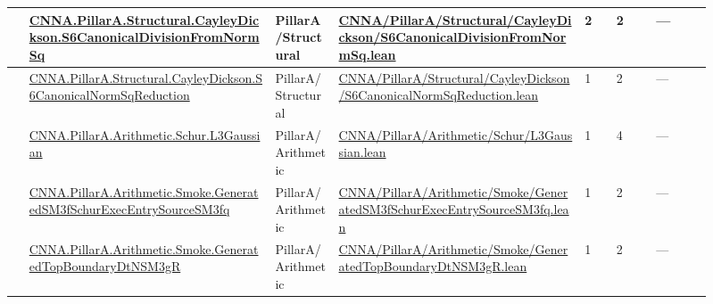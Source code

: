 \begin{longtable}{L{0.025\linewidth} L{0.315\linewidth} L{0.08\linewidth} L{0.315\linewidth} L{0.045\linewidth} L{0.055\linewidth} L{0.07\linewidth}}
\hline
{} & \href{run:repo_snapshot/CNNA/PillarA/Structural/CayleyDickson/S6CanonicalDivisionFromNormSq.lean}{CNNA.\allowbreak{}PillarA.\allowbreak{}Structural.\allowbreak{}CayleyDickson.\allowbreak{}S6CanonicalDivisionFromNormSq} & PillarA/\allowbreak{}Structural & \href{run:repo_snapshot/CNNA/PillarA/Structural/CayleyDickson/S6CanonicalDivisionFromNormSq.lean}{CNNA/\allowbreak{}PillarA/\allowbreak{}Structural/\allowbreak{}CayleyDickson/\allowbreak{}S6CanonicalDivisionFromNormSq.\allowbreak{}lean} & 2 & 2 & ---\\
\hline
{} & \href{run:repo_snapshot/CNNA/PillarA/Structural/CayleyDickson/S6CanonicalNormSqReduction.lean}{CNNA.\allowbreak{}PillarA.\allowbreak{}Structural.\allowbreak{}CayleyDickson.\allowbreak{}S6CanonicalNormSqReduction} & PillarA/\allowbreak{}Structural & \href{run:repo_snapshot/CNNA/PillarA/Structural/CayleyDickson/S6CanonicalNormSqReduction.lean}{CNNA/\allowbreak{}PillarA/\allowbreak{}Structural/\allowbreak{}CayleyDickson/\allowbreak{}S6CanonicalNormSqReduction.\allowbreak{}lean} & 1 & 2 & ---\\
\hline
{} & \href{run:repo_snapshot/CNNA/PillarA/Arithmetic/Schur/L3Gaussian.lean}{CNNA.\allowbreak{}PillarA.\allowbreak{}Arithmetic.\allowbreak{}Schur.\allowbreak{}L3Gaussian} & PillarA/\allowbreak{}Arithmetic & \href{run:repo_snapshot/CNNA/PillarA/Arithmetic/Schur/L3Gaussian.lean}{CNNA/\allowbreak{}PillarA/\allowbreak{}Arithmetic/\allowbreak{}Schur/\allowbreak{}L3Gaussian.\allowbreak{}lean} & 1 & 4 & ---\\
\hline
{} & \href{run:repo_snapshot/CNNA/PillarA/Arithmetic/Smoke/GeneratedSM3fSchurExecEntrySourceSM3fq.lean}{CNNA.\allowbreak{}PillarA.\allowbreak{}Arithmetic.\allowbreak{}Smoke.\allowbreak{}GeneratedSM3fSchurExecEntrySourceSM3fq} & PillarA/\allowbreak{}Arithmetic & \href{run:repo_snapshot/CNNA/PillarA/Arithmetic/Smoke/GeneratedSM3fSchurExecEntrySourceSM3fq.lean}{CNNA/\allowbreak{}PillarA/\allowbreak{}Arithmetic/\allowbreak{}Smoke/\allowbreak{}GeneratedSM3fSchurExecEntrySourceSM3fq.\allowbreak{}lean} & 1 & 2 & ---\\
\hline
{} & \href{run:repo_snapshot/CNNA/PillarA/Arithmetic/Smoke/GeneratedTopBoundaryDtNSM3gR.lean}{CNNA.\allowbreak{}PillarA.\allowbreak{}Arithmetic.\allowbreak{}Smoke.\allowbreak{}GeneratedTopBoundaryDtNSM3gR} & PillarA/\allowbreak{}Arithmetic & \href{run:repo_snapshot/CNNA/PillarA/Arithmetic/Smoke/GeneratedTopBoundaryDtNSM3gR.lean}{CNNA/\allowbreak{}PillarA/\allowbreak{}Arithmetic/\allowbreak{}Smoke/\allowbreak{}GeneratedTopBoundaryDtNSM3gR.\allowbreak{}lean} & 1 & 2 & ---\\

\end{longtable}
